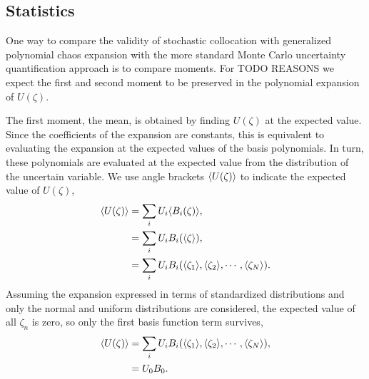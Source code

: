 \subsection{Statistics}
One way to compare the validity of stochastic collocation with generalized polynomial chaos expansion with the more standard Monte Carlo uncertainty quantification approach is to compare moments.  For TODO REASONS we expect the first and second moment to be preserved in the polynomial expansion of $U(\zeta)$.

The first moment, the mean, is obtained by finding $U(\zeta)$ at the expected value.  Since the coefficients of the expansion are constants, this is equivalent to evaluating the expansion at the expected values of the basis polynomials.  In turn, these polynomials are evaluated at the expected value from the distribution of the uncertain variable.  We use angle brackets $\langle U(\zeta) \rangle$ to indicate the expected value of $U(\zeta)$,
\begin{align}
\langle U(\zeta) \rangle &= \sum_{i}U_i\langle B_i(\zeta) \rangle,\\
  &=\sum_i U_i B_i(\langle \zeta \rangle),\\
  &=\sum_i U_i B_i(\langle \zeta_1 \rangle,\langle \zeta_2 \rangle,\cdots,\langle \zeta_N \rangle).
\end{align}
Assuming the expansion expressed in terms of standardized distributions and only the normal and uniform distributions are considered, the expected value of all $\zeta_n$ is zero, so only the first basis function term survives,
\begin{align}
\langle U(\zeta) \rangle &=\sum_i U_i B_i(\langle \zeta_1 \rangle,\langle \zeta_2 \rangle,\cdots,\langle \zeta_N \rangle),\\
  &=U_0B_0.
\end{align}

